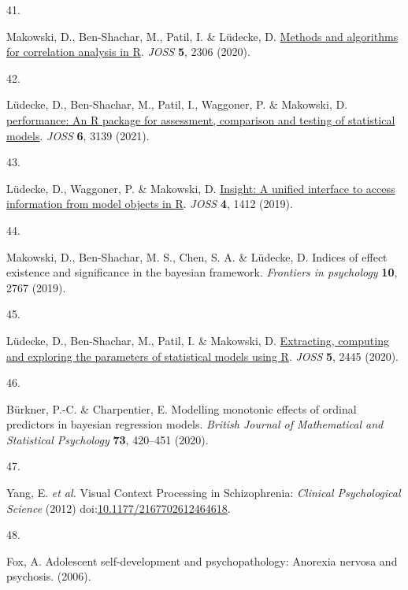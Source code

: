 \documentclass[
  man,floatsintext]{apa6}
\newlength{\cslhangindent}
\newlength{\csllabelwidth}
\newlength{\cslentryspacingunit} %
\newenvironment{CSLReferences}[2] %
 {%
  \setlength{\parindent}{0pt}
  \ifodd #1
  \let\oldpar\par
  \def\par{\hangindent=\cslhangindent\oldpar}
  \fi
  \setlength{\parskip}{#2\cslentryspacingunit}
 }%
 {}
\newcommand{\CSLLeftMargin}[1]{\parbox[t]{\csllabelwidth}{#1}}
\newcommand{\CSLRightInline}[1]{\parbox[t]{\linewidth - \csllabelwidth}{#1}\break}
\begin{document}
\begin{CSLReferences}{0}{0}
\leavevmode{}%
\CSLLeftMargin{41. }%
\CSLRightInline{Makowski, D., Ben-Shachar, M., Patil, I. \& Lüdecke, D. \href{https://doi.org/10.21105/joss.02306}{Methods and algorithms for correlation analysis in {R}}. \emph{JOSS} \textbf{5}, 2306 (2020).}

\leavevmode{}%
\CSLLeftMargin{42. }%
\CSLRightInline{Lüdecke, D., Ben-Shachar, M., Patil, I., Waggoner, P. \& Makowski, D. \href{https://doi.org/10.21105/joss.03139}{{performance}: An {R} package for assessment, comparison and testing of statistical models}. \emph{JOSS} \textbf{6}, 3139 (2021).}

\leavevmode{}%
\CSLLeftMargin{43. }%
\CSLRightInline{Lüdecke, D., Waggoner, P. \& Makowski, D. \href{https://doi.org/10.21105/joss.01412}{Insight: A unified interface to access information from model objects in {R}}. \emph{JOSS} \textbf{4}, 1412 (2019).}

\leavevmode{}%
\CSLLeftMargin{44. }%
\CSLRightInline{Makowski, D., Ben-Shachar, M. S., Chen, S. A. \& Lüdecke, D. Indices of effect existence and significance in the bayesian framework. \emph{Frontiers in psychology} \textbf{10}, 2767 (2019).}

\leavevmode{}%
\CSLLeftMargin{45. }%
\CSLRightInline{Lüdecke, D., Ben-Shachar, M., Patil, I. \& Makowski, D. \href{https://doi.org/10.21105/joss.02445}{Extracting, computing and exploring the parameters of statistical models using {R}}. \emph{JOSS} \textbf{5}, 2445 (2020).}

\leavevmode{}%
\CSLLeftMargin{46. }%
\CSLRightInline{Bürkner, P.-C. \& Charpentier, E. Modelling monotonic effects of ordinal predictors in bayesian regression models. \emph{British Journal of Mathematical and Statistical Psychology} \textbf{73}, 420--451 (2020).}

\leavevmode{}%
\CSLLeftMargin{47. }%
\CSLRightInline{Yang, E. \emph{et al.} Visual Context Processing in Schizophrenia: \emph{Clinical Psychological Science} (2012) doi:\href{https://doi.org/10.1177/2167702612464618}{10.1177/2167702612464618}.}

\leavevmode{}%
\CSLLeftMargin{48. }%
\CSLRightInline{Fox, A. Adolescent self-development and psychopathology: Anorexia nervosa and psychosis. (2006).}


\end{CSLReferences}
\end{document}

